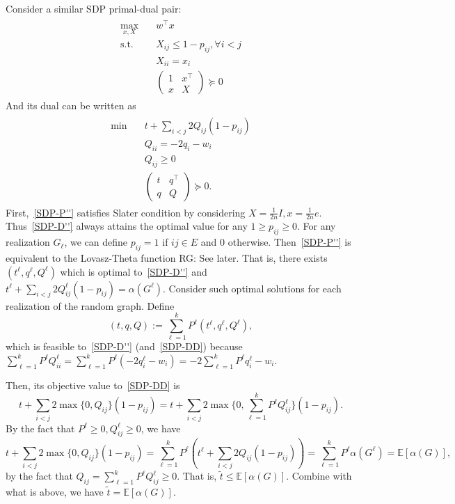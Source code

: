 \documentclass{article}
\newcommand{\E}{\mathbb{E}}
\newcommand{\rgnote}[1]{{\color{magenta} RG: #1}}
\begin{document}
Consider a similar SDP primal-dual pair:
\begin{align}
  \label{SDP-P''}
  \tag{SDP-P''}
  \begin{split}
    \max_{x,X}\quad &w^\top x\\
    \text{s.t.}\quad &X_{ij}\leq 1-p_{ij},\forall i<j\\
    &X_{ii}=x_i\\
    &
    \begin{pmatrix}
      1&x^\top\\
      x&X
    \end{pmatrix}\succeq 0
  \end{split}
\end{align}
And its dual can be written as
\begin{align}
\label{SDP-D''}
  \tag{SDP-D''}
  \begin{split}
    \min\quad &t+\sum_{i<j}2Q_{ij}(1-p_{ij})\\
    &Q_{ii}=-2q_i-w_i\\
    &Q_{ij}\geq 0\\
    &\begin{pmatrix}
      t&q^\top\\
      q&Q
    \end{pmatrix}\succeq 0.
  \end{split}
\end{align}
First,~\ref{SDP-P''} satisfies Slater condition by considering $X=\frac{1}{2n}I,x=\frac{1}{2n}e$. 
Thus~\ref{SDP-D''} always attains the optimal value for any $1\geq p_{ij}\geq 0$.
For any realization $G_\ell$, we can define $p_{ij}=1$ if $ij\in E$ and $0$ otherwise.
Then~\ref{SDP-P''} is equivalent to the Lovasz-Theta function\rgnote{See later}.
That is, there exists $(t^\ell, q^\ell, Q^\ell)$ which is optimal to~\ref{SDP-D''} and $t^\ell+\sum_{i<j}2Q^{\ell}_{ij}(1-p_{ij}) = \alpha(G^\ell)$.
Consider such optimal solutions for each realization of the random graph.
Define
\[(t,q,Q):=\sum_{\ell=1}^{k}P^\ell(t^\ell,q^\ell,Q^\ell),\]
which is feasible to~\ref{SDP-D''} (and~\ref{SDP-DD}) because $\sum_{\ell=1}^{k}P^\ell Q_{ii}^\ell=\sum_{\ell=1}^{k}P^\ell(-2q^{\ell}_i-w_i)=-2\sum_{\ell=1}^{k}P^\ell q^{\ell}_i-w_i$.

Then, its objective value to~\ref{SDP-DD} is 
\[t+\sum_{i<j}2\max\{0,Q_{ij}\}(1-p_{ij})=t+\sum_{i<j}2\max\{0,\sum_{\ell=1}^{k}P^\ell Q^{\ell}_{ij}\}(1-p_{ij}).\]
By the fact that $P^\ell\geq 0, Q_{ij}^{\ell}\geq 0$, we have 
\[t+\sum_{i<j}2\max\{0,Q_{ij}\}(1-p_{ij}) =\sum_{\ell=1}^{k}P^\ell (t^\ell+\sum_{i<j}2Q_{ij}(1-p_{ij}))=\sum_{\ell=1}^{k}P^\ell \alpha(G^\ell)=\E[\alpha(G)],\]
by the fact that $Q_{ij}=\sum_{\ell=1}^{k}P^\ell Q^{\ell}_{ij}\geq 0$.
That is, $\tilde{t}\leq \E[\alpha(G)]$.
Combine with what is above, we have $\tilde{t}=\E[\alpha(G)]$.
\end{document}
